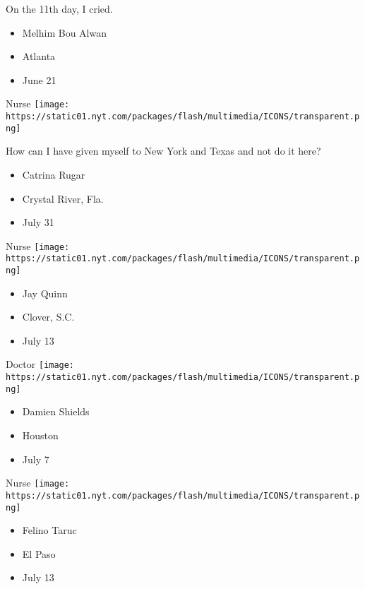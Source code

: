 On the 11th day, I cried.

\begin{itemize}
\tightlist
\item
  Melhim Bou Alwan
\item
  Atlanta
\item
  June 21
\end{itemize}

\protect\hyperlink{item-catrina-rugar}{}

Nurse
\texttt{[image: https://static01.nyt.com/packages/flash/multimedia/ICONS/transparent.png]}

How can I have given myself to New York and Texas and not do it here?

\begin{itemize}
\tightlist
\item
  Catrina Rugar
\item
  Crystal River, Fla.
\item
  July 31
\end{itemize}

\protect\hyperlink{item-jay-quinn}{}

Nurse
\texttt{[image: https://static01.nyt.com/packages/flash/multimedia/ICONS/transparent.png]}

\begin{itemize}
\tightlist
\item
  Jay Quinn
\item
  Clover, S.C.
\item
  July 13
\end{itemize}

\protect\hyperlink{item-damien-shields}{}

Doctor
\texttt{[image: https://static01.nyt.com/packages/flash/multimedia/ICONS/transparent.png]}

\begin{itemize}
\tightlist
\item
  Damien Shields
\item
  Houston
\item
  July 7
\end{itemize}

\protect\hyperlink{item-felino-taruc}{}

Nurse
\texttt{[image: https://static01.nyt.com/packages/flash/multimedia/ICONS/transparent.png]}

\begin{itemize}
\tightlist
\item
  Felino Taruc
\item
  El Paso
\item
  July 13
\end{itemize}

